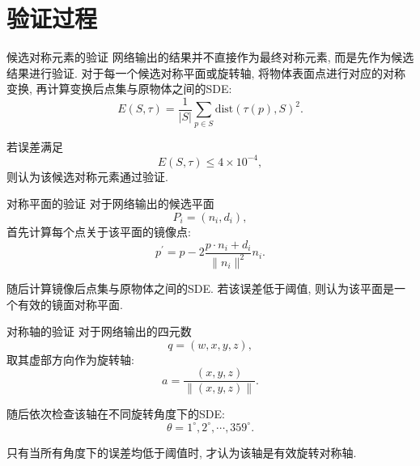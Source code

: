 \documentclass[UTF8, aspectratio=169, 11pt]{ctexbeamer}
\begin{document}
    \section{验证过程}

    \begin{frame}{候选对称元素的验证}
        网络输出的结果并不直接作为最终对称元素, 而是先作为候选结果进行验证. 对于每一个候选对称平面或旋转轴, 将物体表面点进行对应的对称变换, 再计算变换后点集与原物体之间的SDE:
        \begin{equation}
            E(S,\tau)=\frac{1}{|S|}\sum_{p\in S}\mathrm{dist}(\tau(p),S)^2.
        \end{equation}

        若误差满足
        \begin{equation}
            E(S,\tau)\leq 4\times 10^{-4},
        \end{equation}
        则认为该候选对称元素通过验证.
    \end{frame}

    \begin{frame}{对称平面的验证}
        对于网络输出的候选平面
        \begin{equation}
            P_i=(n_i,d_i),
        \end{equation}
        首先计算每个点关于该平面的镜像点:
        \begin{equation}
            p^{\prime}=p-2\frac{p\cdot n_i+d_i}{\|n_i\|^2}n_i.
        \end{equation}

        随后计算镜像后点集与原物体之间的SDE. 若该误差低于阈值, 则认为该平面是一个有效的镜面对称平面.
    \end{frame}

    \begin{frame}{对称轴的验证}
        对于网络输出的四元数
        \begin{equation}
            q=(w,x,y,z),
        \end{equation}
        取其虚部方向作为旋转轴:
        \begin{equation}
            a=\frac{(x,y,z)}{\|(x,y,z)\|}.
        \end{equation}

        随后依次检查该轴在不同旋转角度下的SDE:
        \begin{equation}
            \theta=1^\circ,2^\circ,\cdots,359^\circ.
        \end{equation}

        只有当所有角度下的误差均低于阈值时, 才认为该轴是有效旋转对称轴.
    \end{frame}
\end{document}
